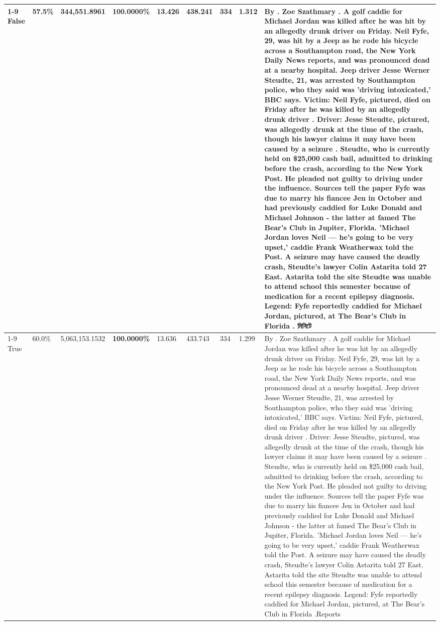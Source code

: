 \begin{table}[H]
\begin{tabular}{lllrlllll}
\cline{1-9}
False & 57.5\% & 344,551.8961 & \bfseries \color{red} 100.0000\% & 13.426 & 438.241 & 334 & 1.312 & By . Zoe Szathmary . A golf caddie for Michael Jordan was killed after he was hit by an allegedly drunk driver on Friday. Neil Fyfe, 29, was hit by a Jeep as he rode his bicycle across a Southampton road, the New York Daily News reports, and was pronounced dead at a nearby hospital. Jeep driver Jesse Werner Steudte, 21, was arrested by Southampton police, who they said was 'driving intoxicated,' BBC says. Victim: Neil Fyfe, pictured, died on Friday after he was killed by an allegedly drunk driver . Driver: Jesse Steudte, pictured, was allegedly drunk at the time of the crash, though his lawyer claims it may have been caused by a seizure . Steudte, who is currently held on \$25,000 cash bail, admitted to drinking before the crash, according to the New York Post. He pleaded not guilty to driving under the influence. Sources tell the paper Fyfe was due to marry his fiancee Jen in October and had previously caddied for Luke Donald and Michael Johnson - the latter at famed The Bear's Club in Jupiter, Florida. 'Michael Jordan loves Neil — he’s going to be very upset,' caddie Frank Weatherwax told the Post. A seizure may have caused the deadly crash, Steudte's lawyer Colin Astarita told 27 East. Astarita told the site Steudte was unable to attend school this semester because of medication for a recent epilepsy diagnosis. Legend: Fyfe reportedly caddied for Michael Jordan, pictured, at The Bear's Club in Florida . মিনিটে \\
\cline{1-9}
True & 60.0\% & 5,063,153.1532 & \bfseries \color{red} 100.0000\% & 13.636 & 433.743 & 334 & 1.299 & By . Zoe Szathmary . A golf caddie for Michael Jordan was killed after he was hit by an allegedly drunk driver on Friday. Neil Fyfe, 29, was hit by a Jeep as he rode his bicycle across a Southampton road, the New York Daily News reports, and was pronounced dead at a nearby hospital. Jeep driver Jesse Werner Steudte, 21, was arrested by Southampton police, who they said was 'driving intoxicated,' BBC says. Victim: Neil Fyfe, pictured, died on Friday after he was killed by an allegedly drunk driver . Driver: Jesse Steudte, pictured, was allegedly drunk at the time of the crash, though his lawyer claims it may have been caused by a seizure . Steudte, who is currently held on \$25,000 cash bail, admitted to drinking before the crash, according to the New York Post. He pleaded not guilty to driving under the influence. Sources tell the paper Fyfe was due to marry his fiancee Jen in October and had previously caddied for Luke Donald and Michael Johnson - the latter at famed The Bear's Club in Jupiter, Florida. 'Michael Jordan loves Neil — he’s going to be very upset,' caddie Frank Weatherwax told the Post. A seizure may have caused the deadly crash, Steudte's lawyer Colin Astarita told 27 East. Astarita told the site Steudte was unable to attend school this semester because of medication for a recent epilepsy diagnosis. Legend: Fyfe reportedly caddied for Michael Jordan, pictured, at The Bear's Club in Florida .Reports \\

\end{tabular}
\end{table}

